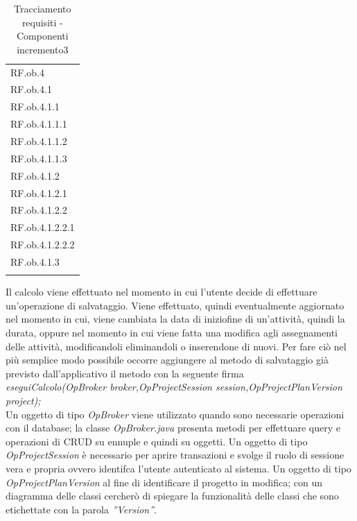 \begin{longtable}{|>{\centering}p{3cm}|}
    \hline
    \multicolumn{1}{|c|}{\textbf{Requisiti}} \\ %
      \hline
        RF.ob.4 \tabularnewline \hline
		RF.ob.4.1 \tabularnewline \hline
		RF.ob.4.1.1 \tabularnewline \hline		
		RF.ob.4.1.1.1 \tabularnewline \hline
		RF.ob.4.1.1.2 \tabularnewline \hline
		RF.ob.4.1.1.3 \tabularnewline \hline
		RF.ob.4.1.2 \tabularnewline \hline
		RF.ob.4.1.2.1 \tabularnewline \hline
		RF.ob.4.1.2.2 \tabularnewline \hline
		RF.ob.4.1.2.2.1 \tabularnewline \hline
		RF.ob.4.1.2.2.2 \tabularnewline \hline
		RF.ob.4.1.3 \tabularnewline \hline
    \caption{Tracciamento requisiti - Componenti incremento3}
    \label{tab:Tracciamento requisiti - Componenti incremento3}
\end{longtable}

Il calcolo viene effettuato nel momento in cui l\textquoteright{}utente decide di effettuare un\textquoteright{}operazione di salvataggio. Viene effettuato, quindi eventualmente aggiornato nel momento in cui, viene cambiata la data di inizio\/fine di un\textquoteright{}attivit\`{a}, quindi la durata, oppure nel momento in cui viene fatta una modifica agli assegnamenti delle attivit\`{a}, modificandoli eliminandoli o inserendone di nuovi. Per fare ci\`{o} nel pi\`{u} semplice modo possibile occorre aggiungere al metodo di salvataggio gi\`{a} previsto dall\textquoteright{}applicativo il metodo con la seguente firma \\
\textit{eseguiCalcolo(OpBroker broker,OpProjectSession session,OpProjectPlanVersion project);} \\
Un oggetto di tipo \textit{OpBroker} viene utilizzato quando sono necessarie operazioni con il database; la classe \textit{OpBroker.java} presenta metodi per effettuare query e operazioni di CRUD su ennuple e quindi su oggetti. Un oggetto di tipo \textit{OpProjectSession} \`{e} necessario per aprire transazioni e svolge il ruolo di sessione vera e propria ovvero identifca l\textquoteright{}utente autenticato al sistema. Un oggetto di tipo \textit{OpProjectPlanVersion} al fine di identificare il progetto in modifica; con un diagramma delle classi cercher\`{o} di spiegare la funzionalit\`{a} delle classi che sono etichettate con la parola \textit{''Version''}.

